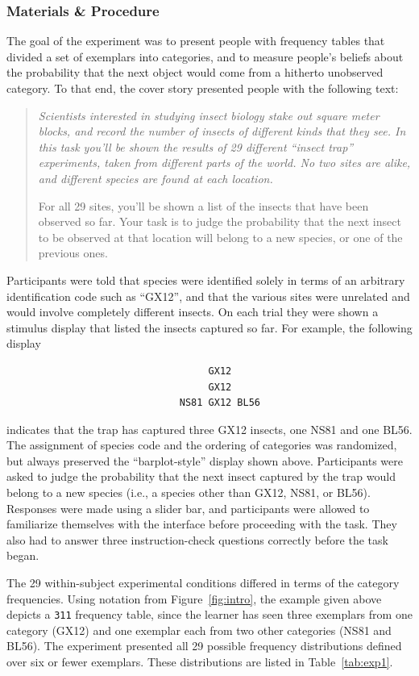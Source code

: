 \documentclass[doc]{apa6}
\newcommand{\dist}[1]{\texttt{#1}}
\begin{document}
\subsubsection{Materials \& Procedure}

The goal of the experiment was to present people with frequency tables that divided a set of exemplars into categories, and to measure people's beliefs about the probability that the next object would come from a hitherto unobserved category. To that end, the cover story presented people with the following text:

\begin{quote}{\it
Scientists interested in studying insect biology stake out square meter blocks, and record the number of insects of different kinds that they see. In this task you'll be shown the results of 29 different ``insect trap'' experiments, taken from different parts of the world. No two sites are alike, and different species are found at each location.

For all 29 sites, you'll be shown a list of the insects that have been observed so far. Your task is to judge the probability that the next insect to be observed at that location will belong to a new species, or one of the previous ones.}
\end{quote}
Participants were told that species were identified solely in terms of an arbitrary identification code such as ``GX12'', and that the various sites were unrelated and would involve completely different insects. On each trial they were shown a stimulus display that listed the insects captured so far. For example, the following display
\begin{verbatim}
                                   GX12
                                   GX12
                              NS81 GX12 BL56
\end{verbatim}
indicates that the trap has captured three GX12 insects, one NS81 and one BL56. The assignment of species code and the ordering of categories was randomized, but always preserved the ``barplot-style'' display shown above. Participants were asked to judge the probability that the next insect captured by the trap would belong to a new species (i.e., a species other than GX12, NS81, or BL56). Responses were made using a slider bar, and participants were allowed to familiarize themselves with the interface before proceeding with the task. They also had to answer three instruction-check questions correctly before the task began.

The 29 within-subject experimental conditions differed in terms of the category frequencies. Using notation from Figure~\ref{fig:intro}, the example given above depicts a \dist{311} frequency table, since the learner has seen three exemplars from one category (GX12) and one exemplar each from two other categories (NS81 and BL56). The experiment presented all 29 possible frequency distributions defined over six or fewer exemplars. These distributions are listed in Table~\ref{tab:exp1}.
\end{document}
